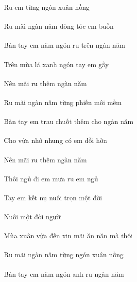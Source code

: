 \documentclass[14pt,a4paper]{extarticle}
\begin{document}
\newpage 


Ru em từng ngón xuân nồng\\[1ex]
{\Huge \ru \em {}   }\\[3ex]

Ru mãi ngàn năm dòng tóc em buồn  \\[1ex]
{\Huge \ru{}\em{}   }\\[1ex]
Bàn tay em năm ngón ru trên ngàn năm \\[1ex]
{\Huge {}\em{}\ru{}  }\\[1ex]
Trên mùa lá xanh ngón tay em gầy \\[1ex]
{\Huge {}\xanh{}\tay\em{}  }\\[1ex]
Nên mãi ru thêm ngàn năm \\[1ex]
{\Huge {}\ru{}}\\[1ex]
Ru mãi ngàn năm từng phiến môi mềm \\[1ex]
{\Huge \ru{}  }\\[1ex]
Bàn tay em trau chuốt thêm cho ngàn năm \\[1ex]
{\Huge {}\em\trau{}\cho{}  }\\[1ex]
Cho vừa nhớ nhung có em dỗi hờn \\[1ex]
{\Huge \cho{}  \nhung{}\em{}  }\\[1ex]
Nên mãi ru thêm ngàn năm \\[1ex]
{\Huge {}\ru{} }\\[1ex]
Thôi ngủ đi em mưa ru em ngủ \\[1ex]
{\Huge {}\em{}\ru\em{}  }\\[1ex]
Tay em kết nụ nuôi trọn một đời \\[1ex]
{\Huge \tay\em{} }\\[1ex] \newpage 
Nuôi một đời người \\[1ex]
{\Huge {} }\\[1ex]
Mùa xuân vừa đến xin mãi ăn năn mà thôi \\[1ex]
{\Huge {}\xin{}  }\\[1ex]
Ru mãi ngàn năm từng ngón xuân nồng \\[1ex]
{\Huge \ru{}  }\\[1ex]
Bàn tay em năm ngón anh ru ngàn năm \\[1ex]
{\Huge {}\em{}\ANh\ru{}  }\\[1ex]
\end{document}
